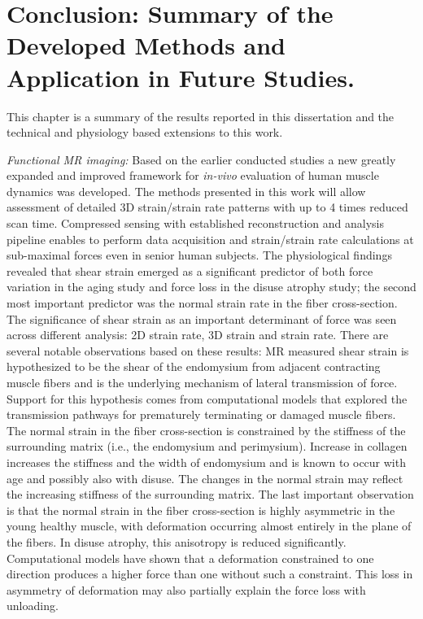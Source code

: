 \chapter{Conclusion: Summary of the Developed Methods and Application in Future Studies.}
This chapter is a summary of the results reported in this dissertation and the technical and physiology based extensions to this work. 

\textit{Functional MR imaging:} Based on the earlier conducted studies a new greatly expanded and improved framework for \textit{in-vivo} evaluation of human muscle dynamics was developed.
The methods presented in this work will allow assessment of detailed 3D strain/strain rate patterns with up to 4 times reduced scan time.
Compressed sensing with established reconstruction and analysis pipeline enables to perform data acquisition and strain/strain rate calculations at sub-maximal forces even in senior human subjects.
The physiological findings revealed that shear strain emerged as a significant predictor of both force variation in the aging study and force loss in the disuse atrophy study; the second most important predictor was the normal strain rate in the fiber cross-section. 
The significance of shear strain as an important determinant of force was seen across different analysis: 2D strain rate, 3D strain and strain rate. 
There are several notable observations based on these results: MR measured shear strain is hypothesized to be the shear of the endomysium from adjacent contracting muscle fibers and is the underlying mechanism of lateral transmission of force. 
Support for this hypothesis comes from computational models that explored the transmission pathways for prematurely terminating or damaged muscle fibers. 
The normal strain in the fiber cross-section is constrained by the stiffness of the surrounding matrix (i.e., the endomysium and perimysium). 
Increase in collagen increases the stiffness and the width of endomysium and is known to occur with age and possibly also with disuse. 
The changes in the normal strain may reflect the increasing stiffness of the surrounding matrix. 
The last important observation is that the normal strain in the fiber cross-section is highly asymmetric in the young healthy muscle, with deformation occurring almost entirely in the plane of the fibers. 
In disuse atrophy, this anisotropy is reduced significantly. 
Computational models have shown that a deformation constrained to one direction produces a higher force than one without such a constraint. 
This loss in asymmetry of deformation may also partially explain the force loss with unloading. 
